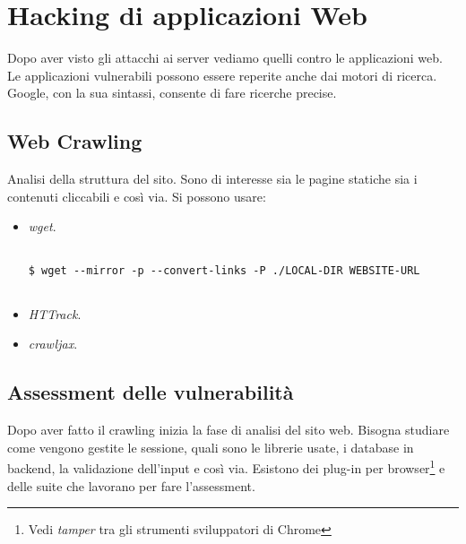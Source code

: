 \documentclass[14pt]{extreport}
\begin{document}
\section{Hacking di applicazioni Web}
Dopo aver visto gli attacchi ai server vediamo quelli contro le applicazioni web. Le applicazioni vulnerabili possono essere reperite anche dai motori di ricerca. Google, con la sua sintassi, consente di fare ricerche precise.

\subsection{Web Crawling}
Analisi della struttura del sito. Sono di interesse sia le pagine statiche sia i contenuti cliccabili e così via. Si possono usare:


\begin{itemize}
    \item \textit{wget}.
    
    
    \vspace{5pt}

{
\small
\begin{tcolorbox}

\begin{verbatim}

$ wget --mirror -p --convert-links -P ./LOCAL-DIR WEBSITE-URL
  
\end{verbatim}

\end{tcolorbox}
}

\vspace{5pt}
    
    
    
    \item \textit{HTTrack}.
    
    
    \item \textit{crawljax}.
\end{itemize}

\subsection{Assessment delle vulnerabilità}
Dopo aver fatto il crawling inizia la fase di analisi del sito web. Bisogna studiare come vengono gestite le sessione, quali sono le librerie usate, i database in backend, la validazione dell'input e così via.
Esistono dei plug-in per browser\footnote{Vedi \textit{tamper} tra gli strumenti sviluppatori di Chrome} e delle suite che lavorano per fare l'assessment.
\end{document}
